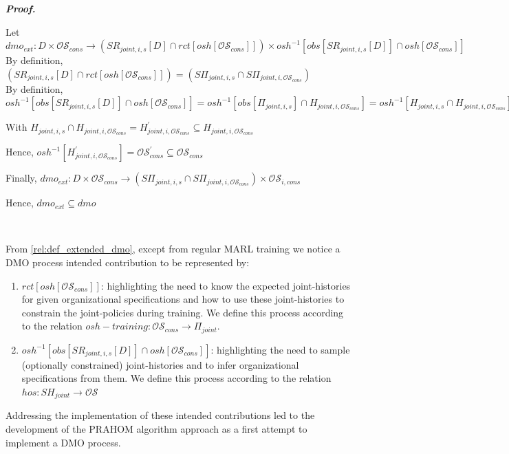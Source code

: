 \documentclass{ecai}
\newcounter{relation}
\newcounter{proof}
\renewcommand{\theproof}{\arabic{proof}}
\renewenvironment{proof}[1][]{
    \refstepcounter{proof}
    \noindent \raggedright \textit{\textbf{Proof. \theproof}}

    \setlength{\leftskip}{1em}

}
{

\
\setlength{\leftskip}{0pt}
}
\begin{document}
\begin{proof}\label{proof:to_extended_dmo}

    Let $dmo_{ext}: D \times \mathcal{OS}_{cons} \rightarrow (SR_{joint,i,s}[D] \cap rct[osh[\mathcal{OS}_{cons}]]) \times osh^{-1}[obs[SR_{joint,i,s}[D]] \cap osh[\mathcal{OS}_{cons}]]$ \\

    By definition, $(SR_{joint,i,s}[D] \cap rct[osh[\mathcal{OS}_{cons}]]) = (S\Pi_{joint,i,s} \cap S\Pi_{joint,i,\mathcal{OS}_{cons}})$ \\

    By definition, $osh^{-1}[obs[SR_{joint,i,s}[D]] \cap osh[\mathcal{OS}_{cons}]] = osh^{-1}[obs[\Pi_{joint,i,s}] \cap H_{joint,i,\mathcal{OS}_{cons}}] = osh^{-1}[H_{joint,i,s} \cap H_{joint,i,\mathcal{OS}_{cons}}]$

    With $H_{joint,i,s} \cap H_{joint,i,\mathcal{OS}_{cons}} = H_{joint,i,\mathcal{OS}_{cons}}^{'} \subseteq H_{joint,i,\mathcal{OS}_{cons}}$

    Hence, $osh^{-1}[H_{joint,i,\mathcal{OS}_{cons}}^{'}] = \mathcal{OS}_{cons}^{'} \subseteq \mathcal{OS}_{cons}$

    Finally, $dmo_{ext}: D \times \mathcal{OS}_{cons} \rightarrow (S\Pi_{joint,i,s} \cap S\Pi_{joint,i,\mathcal{OS}_{cons}}) \times \mathcal{OS}_{i,cons}$

    Hence, $dmo_{ext} \subseteq dmo$
\end{proof}

From \autoref{rel:def_extended_dmo}, except from regular MARL training we notice a DMO process intended contribution to be represented by:
\begin{enumerate}
    \item $rct[osh[\mathcal{OS}_{cons}]]$: highlighting the need to know the expected joint-histories for given organizational specifications and how to use these joint-histories to constrain the joint-policies during training. We define this process according to the relation $osh-training: \mathcal{OS}_{cons} \rightarrow \Pi_{joint}$.
    \item $osh^{-1}[obs[SR_{joint,i,s}[D]] \cap osh[\mathcal{OS}_{cons}]]$: highlighting the need to sample (optionally constrained) joint-histories and to infer organizational specifications from them. We define this process according to the relation $hos: SH_{joint} \rightarrow \mathcal{OS}$
\end{enumerate}

Addressing the implementation of these intended contributions led to the development of the PRAHOM algorithm approach as a first attempt to implement a DMO process.
\end{document}
